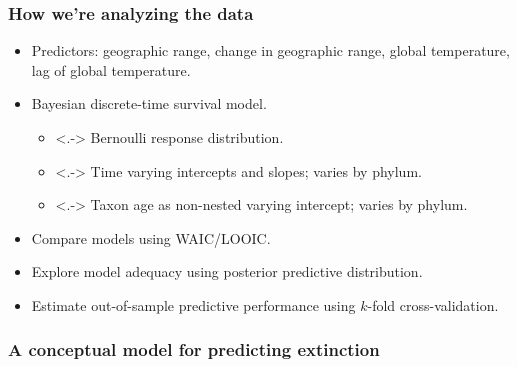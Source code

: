 \documentclass{beamer}
\begin{document}
\begin{frame}
  \frametitle{How we're analyzing the data}

  \begin{itemize}[<+->]
    \item Predictors: geographic range, change in geographic range, global temperature, lag of global temperature.
    \item Bayesian discrete-time survival model.
      \begin{itemize}
        \item<.-> Bernoulli response distribution.
        \item<.-> Time varying intercepts and slopes; varies by phylum.
        \item<.-> Taxon age as non-nested varying intercept; varies by phylum.
      \end{itemize}
    \item \alert{Compare} models using WAIC/LOOIC.
    \item Explore model \alert{adequacy} using posterior predictive distribution.
    \item Estimate out-of-sample \alert{predictive performance} using \(k\)-fold cross-validation.
  \end{itemize}

\end{frame}


\begin{frame}
  \frametitle{A conceptual model for predicting extinction}

\end{frame}
\end{document}
